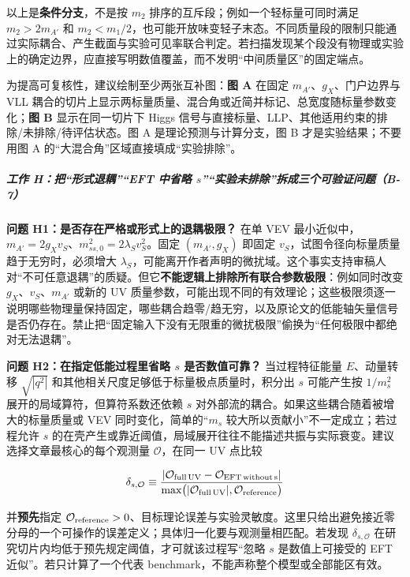 \documentclass[
]{article}
\begin{document}
以上是\textbf{条件分支}，不是按 \(m_2\)
排序的互斥段；例如一个轻标量可同时满足 \(m_2>2m_{A'}\) 和
\(m_2<m_1/2\)，也可能开放味变轻子末态。不同质量段的限制只能通过实际耦合、产生截面与实验可见率联合判定。若扫描发现某个段没有物理或实验上的确定边界，应直接写明数值覆盖，而不发明``中间质量区''的固定端点。

为提高可复核性，建议绘制至少两张互补图：\textbf{图 A} 在固定
\(m_{A'}\)、\(g_X\)、门户边界与 VLL
耦合的切片上显示两标量质量、混合角或近简并标记、总宽度随标量参数变化；\textbf{图
B} 显示在同一切片下 Higgs
信号与直接标量、LLP、其他适用约束的排除/未排除/待评估状态。图 A
是理论预测与计算分支，图 B 才是实验结果；不要用图 A
的``大混合角''区域直接填成``实验排除''。

\subparagraph{\texorpdfstring{工作 H：把``形式退耦''``EFT 中省略
\(s\)''``实验未排除''拆成三个可验证问题（B-7）}{工作 H：把``形式退耦''\,``EFT 中省略 s''\,``实验未排除''拆成三个可验证问题（B-7）}}\label{ux5de5ux4f5c-hux628aux5f62ux5f0fux9000ux8026eft-ux4e2dux7701ux7565-sux5b9eux9a8cux672aux6392ux9664ux62c6ux6210ux4e09ux4e2aux53efux9a8cux8bc1ux95eeux9898b-7}

\textbf{问题 H1：是否存在严格或形式上的退耦极限？} 在单 VEV
最小近似中，\(m_{A'}=2g_Xv_S\)、\(m_{ss,0}^2=2\lambda_Sv_S^2\)。固定
\((m_{A'},g_X)\) 即固定 \(v_S\)，试图令径向标量质量趋于无穷时，必须增大
\(\lambda_S\)，可能离开作者声明的微扰域。这个事实支持审稿人对``不可任意退耦''的质疑。但它\textbf{不能逻辑上排除所有联合参数极限}：例如同时改变
\(g_X\)、\(v_S\)、\(m_{A'}\) 或新的 UV
质量参数，可能出现不同的有效理论；这些极限须逐一说明哪些物理量保持固定，哪些耦合趋零/趋无穷，以及原论文的低能轴矢量信号是否仍存在。禁止把``固定输入下没有无限重的微扰极限''偷换为``任何极限中都绝对无法退耦''。

\textbf{问题 H2：在指定低能过程里省略 \(s\) 是否数值可靠？}
当过程特征能量 \(E\)、动量转移 \(\sqrt{|q^2|}\)
和其他相关尺度足够低于标量极点质量时，积分出 \(s\) 可能产生按
\(1/m_s^2\) 展开的局域算符，但算符系数还依赖 \(s\)
对外部流的耦合。如果这些耦合随着被增大的标量质量或 VEV
同时变化，简单的``\(m_s\) 较大所以贡献小''不一定成立；若过程允许 \(s\)
的在壳产生或靠近阈值，局域展开往往不能描述共振与实际衰变。建议选择文章最核心的每个观测量
\(\mathcal O\)，在同一 UV 点比较

\[
 \delta_{s,\mathcal O}\equiv
 \frac{|\mathcal O_{\rm full\,UV}-\mathcal O_{\rm EFT\,without\,s}|}
 {\max\bigl(|\mathcal O_{\rm full\,UV}|,\mathcal O_{\rm reference}\bigr)}
\]

并\textbf{预先}指定
\(\mathcal O_{\rm reference}>0\)、目标理论误差与实验灵敏度。这里只给出避免接近零分母的一个可操作的误差定义；具体归一化要与观测量相匹配。若发现
\(\delta_{s,\mathcal O}\)
在研究切片内均低于预先规定阈值，才可就该过程写``忽略 \(s\)
是数值上可接受的 EFT 近似''。若只计算了一个代表
benchmark，不能声称整个模型或全部能区有效。
\end{document}
